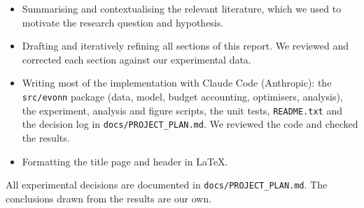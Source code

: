\documentclass[11pt,a4paper]{article}
\begin{document}
\begin{itemize}
  \item Summarising and contextualising the relevant literature, which we used to motivate the
        research question and hypothesis.
  \item Drafting and iteratively refining all sections of this report. We reviewed and corrected
        each section against our experimental data.
  \item Writing most of the implementation with Claude Code (Anthropic): the \texttt{src/evonn}
        package (data, model, budget accounting, optimisers, analysis), the experiment, analysis and
        figure scripts, the unit tests, \texttt{README.txt} and the decision log in
        \texttt{docs/PROJECT\_PLAN.md}. We reviewed the code and checked the results.
  \item Formatting the title page and header in \LaTeX.
\end{itemize}

All experimental decisions are documented in \texttt{docs/PROJECT\_PLAN.md}. The conclusions drawn
from the results are our own.



\end{document}
